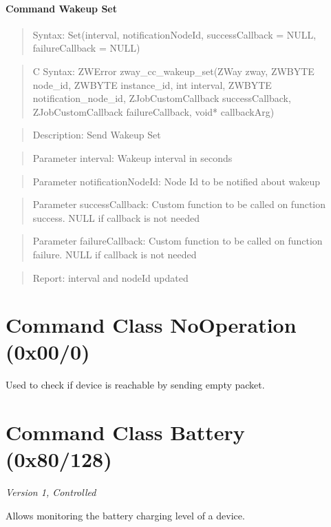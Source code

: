 \paragraph{Command Wakeup Set}
\begin{quote}Syntax: Set(interval, notificationNodeId, successCallback = NULL, failureCallback = NULL)\end{quote}
\begin{quote}C Syntax: ZWError zway\_cc\_wakeup\_set(ZWay zway, ZWBYTE node\_id, ZWBYTE instance\_id, int interval, ZWBYTE notification\_node\_id, ZJobCustomCallback successCallback, ZJobCustomCallback failureCallback, void* callbackArg)\end{quote}
\begin{quote}Description: Send Wakeup Set\end{quote}
\begin{quote}Parameter interval: Wakeup interval in seconds\end{quote}
\begin{quote}Parameter notificationNodeId: Node Id to be notified about wakeup\end{quote}
\begin{quote}Parameter successCallback: Custom function to be called on function success. NULL if callback is not needed\end{quote}
\begin{quote}Parameter failureCallback: Custom function to be called on function failure. NULL if callback is not needed\end{quote}
\begin{quote}Report: interval and nodeId updated\end{quote}


\section{Command Class NoOperation (0x00/0)}

Used to check if device is reachable by sending empty packet.

\section{Command Class Battery (0x80/128)}

\textit{Version 1, Controlled}
\newline

Allows monitoring the battery charging level of a device.
\newline

